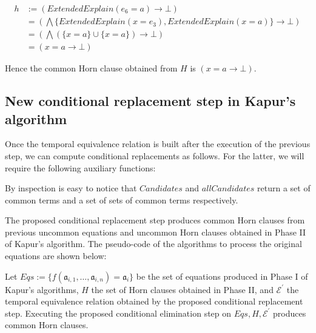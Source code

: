 \begin{example}
  \begin{equation*}
    \begin{aligned}
      h &:= (ExtendedExplain(e_6 = a) 
      \rightarrow \bot) \\
      &= (\bigwedge \{ExtendedExplain(x = e_3), 
      ExtendedExplain(x = a)\} \rightarrow \bot) \\
      &= (\bigwedge(\{x = a\} \cup \{x = a\}) \rightarrow \bot) \\
      &= (x = a \rightarrow \bot)
    \end{aligned}
  \end{equation*}

  Hence the common Horn clause obtained from $H$
  is $(x = a \rightarrow \bot)$.

\end{example}

\subsection{New conditional replacement
step in Kapur's algorithm}

Once the temporal equivalence relation is built after 
the execution of the previous step, we can compute conditional
replacements as follows. For the latter, we will require 
the following auxiliary functions:




By inspection is easy to notice that $Candidates$ 
and $allCandidates$ return a set of common terms and
a set of sets of common terms respectively.

The proposed conditional replacement step produces common Horn 
clauses from previous uncommon equations and uncommon Horn 
clauses obtained in Phase II of Kapur's algorithm.
The pseudo-code of the algorithms to 
process the original equations are shown below:




\begin{lemma} \label{conditional_replacement_lemma}
  Let $Eqs := \{f(\mathfrak{a}_{i, 1}, \dots, \mathfrak{a}_{i, n}) 
  = \mathfrak{a}_i\}$ be the set of equations produced
  in Phase I of Kapur's algorithms, $H$ the set of 
  Horn clauses obtained in Phase II, and 
  $\mathcal{E^{'}}$ the 
  temporal equivalence
  relation obtained by the proposed 
  conditional replacement step.
  Executing the proposed conditional elimination step
  on $Eqs, H, \mathcal{E^{'}}$ 
  produces common Horn clauses.
\end{lemma}


